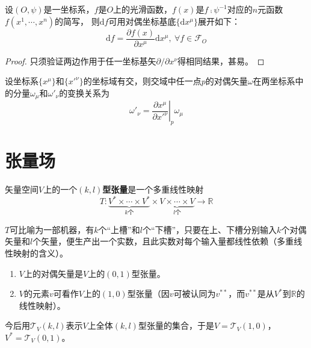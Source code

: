 \begin{theorem}
设$(O, \psi)$是一坐标系，$f$是$O$上的光滑函数，$f(x)$是$f \comp \psi^{-1}$对应的$n$元函数$f(x^1, \cdots, x^n)$的简写，
则$\mathrm{d}f$可用对偶坐标基底$\{\mathrm{d}x^\mu\}$展开如下：
$$\mathrm{d}f = \frac{\partial f(x)}{\partial x^\mu}\mathrm{d}x^\mu, ~ \forall f \in \mathscr{F}_O$$
\end{theorem}

\begin{proof}
只须验证两边作用于任一坐标基矢$\partial / \partial x^\nu$得相同结果，甚易。
\end{proof}

\begin{theorem}
设坐标系$\{x^\mu\}$和$\{x'^\nu\}$的坐标域有交，则交域中任一点$p$的对偶矢量$\omega$在两坐标系中的分量$\omega_\mu$和$\omega'_\nu$的变换关系为
$$\omega'_\nu = \left.\frac{\partial x^\mu}{\partial x'^\nu}\right|_p\omega_\mu$$
\end{theorem}

\section{张量场}

\begin{definition}
矢量空间$V$上的一个\textbf{$(k, l)$型张量}是一个多重线性映射
$$T \colon \underbrace{V^* \times \cdots \times V^*}_\text{$k$个} \times \underbrace{V \times \cdots \times V}_\text{$l$个} \to \mathbb{R}$$
\end{definition}

\begin{note}
$T$可比喻为一部机器，有$k$个``上槽''和$l$个``下槽''，只要在上、下槽分别输入$k$个对偶矢量和$l$个矢量，便生产出一个实数，且此实数对每个输入量都线性依赖（多重线性映射的含义）。
\end{note}

\begin{example}
\begin{enumerate}[（1）]
\item $V$上的对偶矢量是$V$上的$(0, 1)$型张量。
\item $V$的元素$v$可看作$V$上的$(1, 0)$型张量（因$v$可被认同为$v^{**}$，而$v^{**}$是从$V^*$到$\mathbb{R}$的线性映射）。
\end{enumerate}
\end{example}

今后用$\mathscr{T}_V(k, l)$表示$V$上全体$(k, l)$型张量的集合，于是$V = \mathscr{T}_V(1, 0)$，$V^* = \mathscr{T}_V(0, 1)$。

